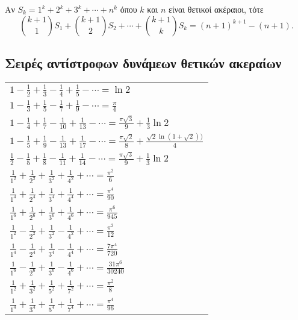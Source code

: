Αν $ S_{k} = 1^{k} + 2^{k} + 3^{k} + \cdots + n^{k} $ όπου $ k $ και $ n
$ είναι θετικοί ακέραιοι, τότε
\[
    \binom{k+1}{1} S_{1} + \binom{k+1}{2} S_{2} + \cdots + \binom{k+1}{k}
    S_{k} = (n+1)^{k+1} - (n+1).
\] 

\subsection{Σειρές αντίστροφων δυνάμεων θετικών ακεραίων}

\begin{tabular}{l}
    $ 1 - \frac{1}{2} + \frac{1}{3} - \frac{1}{4} + \frac{1}{5} - \cdots =
    \ln{2} $ \\
    $ 1 - \frac{1}{3} + \frac{1}{5} - \frac{1}{7} + \frac{1}{9} - \cdots =
    \frac{\pi}{4} $ \\
    $ 1 - \frac{1}{4} + \frac{1}{7} - \frac{1}{10} + \frac{1}{13} - \cdots =
    \frac{\pi \sqrt{3}}{9} + \frac{1}{3} \ln{2} $ \\
    $ 1 - \frac{1}{5} + \frac{1}{9} - \frac{1}{13} + \frac{1}{17} - \cdots =
    \frac{\pi \sqrt{2}}{8} + \frac{\sqrt{2} \ln{(1 + \sqrt{2})})}{4} $ \\
    $ \frac{1}{2} - \frac{1}{5} + \frac{1}{8} - \frac{1}{11} + \frac{1}{14}
    - \cdots = \frac{\pi \sqrt{3}}{9} + \frac{1}{3} \ln{2}$ \\
    $ \frac{1}{1^{2}} + \frac{1}{2^{2}} + \frac{1}{3^{2}} + \frac{1}{4^{2}}
    + \cdots = \frac{\pi ^{2}}{6} $ \\
    $ \frac{1}{1^{4}} + \frac{1}{2^{4}} + \frac{1}{3^{4}} + \frac{1}{4^{4}}
    + \cdots = \frac{\pi^{4}}{90}  $ \\
    $ \frac{1}{1^{6}} + \frac{1}{2^{6}} + \frac{1}{3^{6}} + \frac{1}{4^{6}}
    + \cdots = \frac{\pi ^{6}}{945} $ \\
    $ \frac{1}{1^{2}} - \frac{1}{2^{2}} + \frac{1}{3^{2}} - \frac{1}{4^{2}}
    + \cdots = \frac{\pi ^{2}}{12} $ \\
    $ \frac{1}{1^{4}} - \frac{1}{2^{4}} + \frac{1}{3^{4}} - \frac{1}{4^{4}}
    + \cdots = \frac{7 \pi ^{4}}{720} $ \\
    $ \frac{1}{1^{6}} - \frac{1}{2^{6}} + \frac{1}{3^{6}} - \frac{1}{4^{6}}
    + \cdots = \frac{31 \pi ^{6}}{30240} $ \\
    $ \frac{1}{1^{2}} + \frac{1}{3^{2}} + \frac{1}{5^{2}} + \frac{1}{7^{2}}
    + \cdots = \frac{\pi ^{2}}{8} $ \\
    $ \frac{1}{1^{4}} + \frac{1}{3^{4}} + \frac{1}{5^{4}} + \frac{1}{7^{4}}
    + \cdots = \frac{\pi ^{4}}{96}  $ \\

\end{tabular}
